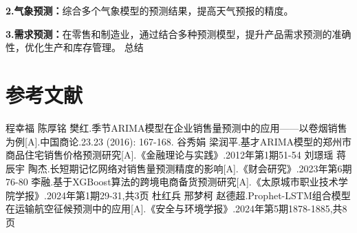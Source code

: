 \documentclass[a4paper]{article}
\begin{document}
	\textbf{2.气象预测：}综合多个气象模型的预测结果，提高天气预报的精度。
	
	\textbf{3.需求预测：}在零售和制造业，通过结合多种预测模型，提升产品需求预测的准确性，优化生产和库存管理。
	总结
	\newpage
	\pagestyle{plain}
	\section{参考文献}
	\begin{thebibliography}{9}
		程幸福 \hspace{2pt}陈厚铭 \hspace{2pt}樊红.季节ARIMA模型在企业销售量预测中的应用——以卷烟销售为例[A].中国商论.23.23 (2016): 167-168.
		谷秀娟 \hspace{2pt}梁润平.基才ARIMA模型的郑州市商品住宅销售价格预测研究[A].《金融理论与实践》.2012年第1期51-54
		刘璟瑶 \hspace{2pt}蒋辰宇 \hspace{2pt}陶杰.长短期记忆网络对销售量预测精度的影响[A].《财会研究》.2023年第6期76-80
		李融.基于XGBoost算法的跨境电商备货预测研究[A].《太原城市职业技术学院学报》.2024年第1期29-31,共3页
		杜红兵 \hspace{2pt}邢梦柯 \hspace{2pt}赵德超.Prophet-LSTM组合模型在运输航空征候预测中的应用[A].《安全与环境学报》.2024年第5期1878-1885,共8页
	\end{thebibliography}
	\newpage %
\end{document}
